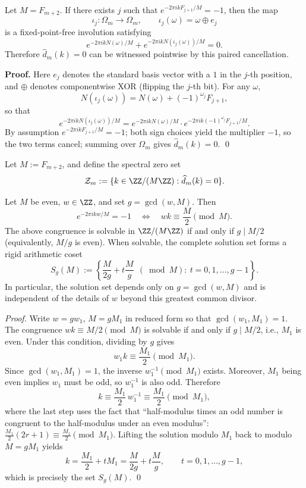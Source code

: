 \begin{corollary}\label{cor:fold-spectrum-zero-involution}
Let $M=F_{m+2}$. If there exists $j$ such that $e^{-2\pi i k F_{j+1}/M}=-1$, then the map
\[
\iota_j:\Omega_m\to\Omega_m,\qquad \iota_j(\omega)=\omega\oplus e_j
\]
is a fixed-point-free involution satisfying
\[
e^{-2\pi i k N(\omega)/M}+e^{-2\pi i k N(\iota_j(\omega))/M}=0.
\]
Therefore $\widehat d_m(k)=0$ can be witnessed pointwise by this paired cancellation.
\end{corollary}

\textbf{Proof.}
Here $e_j$ denotes the standard basis vector with a $1$ in the $j$-th position, and $\oplus$ denotes componentwise XOR (flipping the $j$-th bit). For any $\omega$,
\[
N(\iota_j(\omega))=N(\omega)+(-1)^{\omega_j}F_{j+1},
\]
so that
\[
e^{-2\pi i k N(\iota_j(\omega))/M}
=e^{-2\pi i k N(\omega)/M}\cdot e^{-2\pi i k(-1)^{\omega_j}F_{j+1}/M}.
\]
By assumption $e^{-2\pi i k F_{j+1}/M}=-1$; both sign choices yield the multiplier $-1$, so the two terms cancel; summing over $\Omega_m$ gives $\widehat d_m(k)=0$. \qed

\begin{definition}\label{def:fold-spectrum-zero-set}
Let \(M:=F_{m+2}\), and define the spectral zero set
\[
\mathcal{Z}_m:=\{k\in\ZZ/(M\ZZ):\widehat d_m(k)=0\}.
\]
\end{definition}

\begin{theorem}\label{thm:fold-zero-coset-rigidity}
Let \(M\) be even, \(w\in\ZZ\), and set \(g=\gcd(w,M)\).
Then
\[
e^{-2\pi i k w/M}=-1
\quad\Longleftrightarrow\quad
wk\equiv \frac{M}{2}\pmod M.
\]
The above congruence is solvable in \(\ZZ/(M\ZZ)\) if and only if \(g\mid M/2\) (equivalently, \(M/g\) is even).
When solvable, the complete solution set forms a rigid arithmetic coset
\[
S_g(M):=\left\{\frac{M}{2g}+t\frac{M}{g}\ \ (\bmod M):\ t=0,1,\dots,g-1\right\}.
\]
In particular, the solution set depends only on \(g=\gcd(w,M)\) and is independent of the details of \(w\) beyond this greatest common divisor.
\end{theorem}

\begin{proof}
Write \(w=gw_1\), \(M=gM_1\) in reduced form so that \(\gcd(w_1,M_1)=1\).
The congruence \(wk\equiv M/2\pmod M\) is solvable if and only if \(g\mid M/2\), i.e., \(M_1\) is even.
Under this condition, dividing by \(g\) gives
\[
w_1k\equiv \frac{M_1}{2}\pmod{M_1}.
\]
Since \(\gcd(w_1,M_1)=1\), the inverse \(w_1^{-1}\pmod{M_1}\) exists. Moreover, \(M_1\) being even implies \(w_1\) must be odd, so \(w_1^{-1}\) is also odd.
Therefore
\[
k\equiv \frac{M_1}{2}\,w_1^{-1}\equiv \frac{M_1}{2}\pmod{M_1},
\]
where the last step uses the fact that ``half-modulus times an odd number is congruent to the half-modulus under an even modulus'': \(\frac{M_1}{2}(2r+1)\equiv \frac{M_1}{2}\pmod{M_1}\).
Lifting the solution modulo \(M_1\) back to modulo \(M=gM_1\) yields
\[
k=\frac{M_1}{2}+tM_1=\frac{M}{2g}+t\frac{M}{g},\qquad t=0,1,\dots,g-1,
\]
which is precisely the set \(S_g(M)\). \qed
\end{proof}

